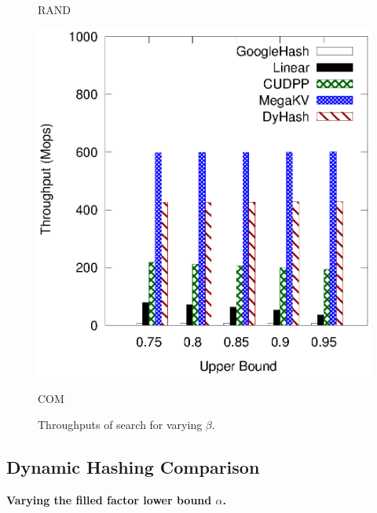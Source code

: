 \begin{figure}[h]
\begin{minipage}{0.19\linewidth}
	\centerline{RAND}
	\end{minipage}
	\hfill
	\begin{minipage}{0.19\linewidth}\centering
	\includegraphics[width=\linewidth]{pic/static-upper/upper_search_ali.eps}
	\centerline{COM}
	\end{minipage}
	\caption{Throughputs of search for varying $\beta$.}
	\label{fig:static}
\end{figure}


\subsection{Dynamic Hashing Comparison}\label{sec:exp:dynamic}

\vspace{1mm}\noindent\textbf{Varying the filled factor lower bound $\alpha$.}

